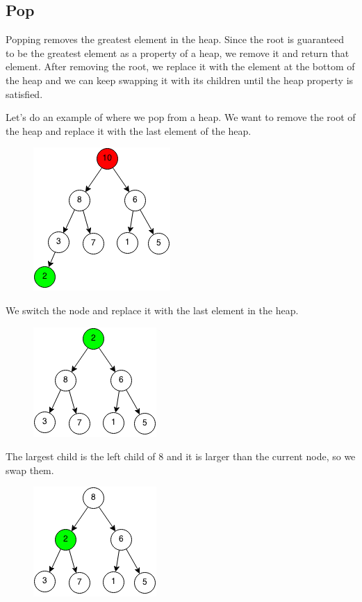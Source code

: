 \documentclass[11pt,oneside]{book}
\makeatletter
\def\maxwidth#1{\ifdim\Gin@nat@width>#1 #1\else\Gin@nat@width\fi}
\makeatother
\begin{document}
\subsection{Pop}

Popping removes the greatest element in the heap. Since the root is guaranteed to be the greatest element as a property of a heap, we remove it and return that element. After removing the root, we replace it with the element at the bottom of the heap and we can keep swapping it with its children until the heap property is satisfied.

Let's do an example of where we pop from a heap. We want to remove the root of the heap and replace it with the last element of the heap.

\vspace{5px}\begin{figure}[H]\centering
        \includegraphics[width=0.66\maxwidth{\textwidth}]{maxheappop.png}
        \end{figure}

We switch the node and replace it with the last element in the heap.

\vspace{5px}\begin{figure}[H]\centering
        \includegraphics[width=0.66\maxwidth{\textwidth}]{maxheappop1.png}
        \end{figure}

The largest child is the left child of 8 and it is larger than the current node, so we swap them.

\vspace{5px}\begin{figure}[H]\centering
        \includegraphics[width=0.66\maxwidth{\textwidth}]{maxheappop2.png}
        \end{figure}
\end{document}
